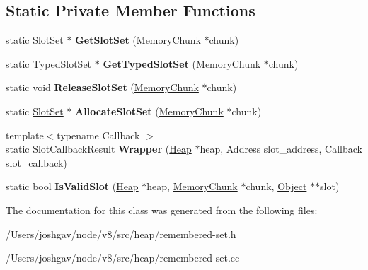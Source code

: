 \subsection*{Static Private Member Functions}
\begin{DoxyCompactItemize}
\item 
static \hyperlink{classv8_1_1internal_1_1_slot_set}{Slot\+Set} $\ast$ {\bfseries Get\+Slot\+Set} (\hyperlink{classv8_1_1internal_1_1_memory_chunk}{Memory\+Chunk} $\ast$chunk)\hypertarget{classv8_1_1internal_1_1_remembered_set_acc2d576ac8b71c5ced01bb0bae44afcb}{}\label{classv8_1_1internal_1_1_remembered_set_acc2d576ac8b71c5ced01bb0bae44afcb}

\item 
static \hyperlink{classv8_1_1internal_1_1_typed_slot_set}{Typed\+Slot\+Set} $\ast$ {\bfseries Get\+Typed\+Slot\+Set} (\hyperlink{classv8_1_1internal_1_1_memory_chunk}{Memory\+Chunk} $\ast$chunk)\hypertarget{classv8_1_1internal_1_1_remembered_set_a2fda765b6d45d52e57465e7717720ca5}{}\label{classv8_1_1internal_1_1_remembered_set_a2fda765b6d45d52e57465e7717720ca5}

\item 
static void {\bfseries Release\+Slot\+Set} (\hyperlink{classv8_1_1internal_1_1_memory_chunk}{Memory\+Chunk} $\ast$chunk)\hypertarget{classv8_1_1internal_1_1_remembered_set_a1cff44589d0b4e1ebbe0ce5c0a297997}{}\label{classv8_1_1internal_1_1_remembered_set_a1cff44589d0b4e1ebbe0ce5c0a297997}

\item 
static \hyperlink{classv8_1_1internal_1_1_slot_set}{Slot\+Set} $\ast$ {\bfseries Allocate\+Slot\+Set} (\hyperlink{classv8_1_1internal_1_1_memory_chunk}{Memory\+Chunk} $\ast$chunk)\hypertarget{classv8_1_1internal_1_1_remembered_set_aac642eee61c574b0fad60ba64fda5b83}{}\label{classv8_1_1internal_1_1_remembered_set_aac642eee61c574b0fad60ba64fda5b83}

\item 
{\footnotesize template$<$typename Callback $>$ }\\static Slot\+Callback\+Result {\bfseries Wrapper} (\hyperlink{classv8_1_1internal_1_1_heap}{Heap} $\ast$heap, Address slot\+\_\+address, Callback slot\+\_\+callback)\hypertarget{classv8_1_1internal_1_1_remembered_set_accbc9b1839c079d7968d0f4c5c869c75}{}\label{classv8_1_1internal_1_1_remembered_set_accbc9b1839c079d7968d0f4c5c869c75}

\item 
static bool {\bfseries Is\+Valid\+Slot} (\hyperlink{classv8_1_1internal_1_1_heap}{Heap} $\ast$heap, \hyperlink{classv8_1_1internal_1_1_memory_chunk}{Memory\+Chunk} $\ast$chunk, \hyperlink{classv8_1_1internal_1_1_object}{Object} $\ast$$\ast$slot)\hypertarget{classv8_1_1internal_1_1_remembered_set_a5c42e2243365254ea89dd6c35008c384}{}\label{classv8_1_1internal_1_1_remembered_set_a5c42e2243365254ea89dd6c35008c384}

\end{DoxyCompactItemize}


The documentation for this class was generated from the following files\+:\begin{DoxyCompactItemize}
\item 
/\+Users/joshgav/node/v8/src/heap/remembered-\/set.\+h\item 
/\+Users/joshgav/node/v8/src/heap/remembered-\/set.\+cc\end{DoxyCompactItemize}
